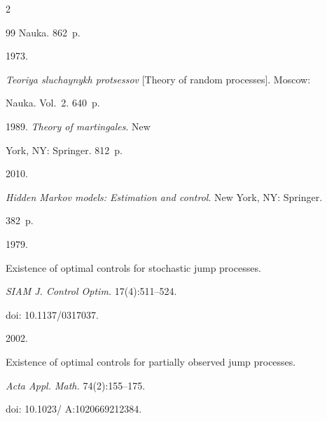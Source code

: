 \begin{multicols}{2}
{{\begin{thebibliography}{99}
Nauka. 862~p.









 1973. 


\textit{Teoriya sluchaynykh protsessov} [Theory of random processes]. Moscow: 


Nauka. Vol.~2. 640~p.









 1989. \textit{Theory of martingales}. New 


York, NY: Springer. 812~p.















 2010. 


\textit{Hidden Markov models: Estimation and control}. New York, NY: Springer. 


382~p.









 1979. 


Existence of optimal controls for stochastic jump processes. 


\textit{SIAM J. Control Optim.} 17(4):511--524.


doi: 10.1137/0317037.









 2002. 


Existence of optimal controls for partially observed jump processes. 


\textit{Acta Appl. Math.} 74(2):155--175.


doi: 10.1023/ A:1020669212384.






\end{thebibliography}}}
\end{multicols}
